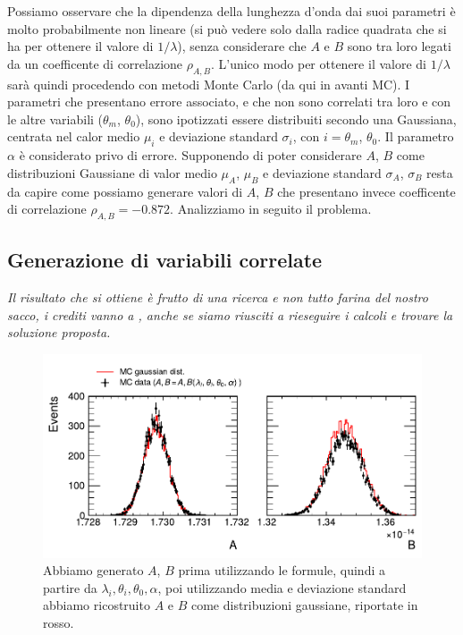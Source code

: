 \documentclass[a4paper,aps,12pt,tightenlines]{revtex4-2}
\begin{document}
Possiamo osservare che la dipendenza della lunghezza d'onda dai suoi parametri è molto probabilmente non lineare (si può vedere solo dalla radice quadrata che si ha per ottenere il valore di $1/\lambda$), senza considerare che $A$ e $B$ sono tra loro legati da un coefficente di correlazione $\rho_{A,B}$. L'unico modo per ottenere il valore di $1/\lambda$ sarà quindi procedendo con metodi Monte Carlo (da qui in avanti MC). I parametri che presentano errore associato, e che non sono correlati tra loro e con le altre variabili ($\theta_m$, $\theta_0$), sono ipotizzati essere distribuiti secondo una Gaussiana, centrata nel calor medio $\mu_i$ e deviazione standard $\sigma_i$, con $i=\theta_m$, $\theta_0$. Il parametro $\alpha$ è considerato privo di errore. Supponendo di poter considerare $A$, $B$ come distribuzioni Gaussiane di valor medio $\mu_A$, $\mu_B$ e deviazione standard $\sigma_A$, $\sigma_B$ resta da capire come possiamo generare valori di $A$, $B$ che presentano invece coefficente di correlazione $\rho_{A,B} = \num{-0.872}$. Analizziamo in seguito il problema.

\subsection{Generazione di variabili correlate}
\emph{Il risultato che si ottiene è frutto di una ricerca e non tutto farina del nostro sacco, i crediti vanno a \cite{anthonyAnswerHowDoes2015, sobolevAnswerHowDoes2015, kaiserSamplePopulationScore1962}, anche se siamo riusciti a rieseguire i calcoli e trovare la soluzione proposta. }

\begin{figure}
\centering
\includegraphics{../figures_and_tests/gaus_compAB.pdf}
\caption{Abbiamo generato $A$, $B$ prima utilizzando le formule, quindi a partire da $\lambda_i, \theta_i, \theta_0, \alpha$, poi utilizzando media e deviazione standard abbiamo ricostruito $A$ e $B$ come distribuzioni gaussiane, riportate in rosso.\label{fig:A_B_gaus}}
\end{figure}
\end{document}
